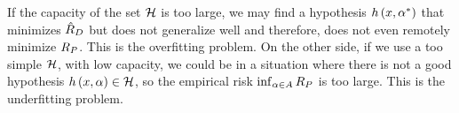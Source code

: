 If the capacity of the set $\mathcal{H}$ is too large, we may find a
hypothesis $h\left(x, {\alpha}^*\right)$ that minimizes $\hat{R}_{D}$ but does not 
generalize well and therefore, does not even remotely minimize $R_P$. This is the 
overfitting problem. 
On the other side, if we use a too simple $\mathcal{H}$, 
with low capacity, we could be in a situation where there is not a good hypothesis $h\left(x, \alpha\right) \in \mathcal{H}$, so the empirical risk $\inf_{\alpha \in A} R_P$ is too large. This is the underfitting problem.




